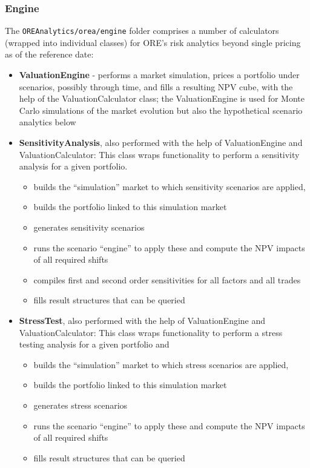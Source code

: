\documentclass[12pt, a4paper]{report}
\begin{document}
\subsubsection{Engine}
The {\tt OREAnalytics/orea/engine} folder comprises a number of calculators (wrapped into individual classes) for ORE's risk analytics beyond single pricing as of the reference date:
\begin{itemize}
\item {\bf ValuationEngine} - performs a market simulation, prices a portfolio under scenarios, possibly through time, and fills a resulting NPV cube, with the help of the ValuationCalculator class; the ValuationEngine is used for Monte Carlo simulations of the market evolution but also the hypothetical scenario analytics below
\item {\bf SensitivityAnalysis}, also performed with the help of ValuationEngine and ValuationCalculator: This class wraps functionality to perform a sensitivity analysis for a given portfolio.
\begin{itemize}
\item builds the ``simulation'' market to which sensitivity scenarios are applied, 
\item builds the portfolio linked to this simulation market
\item generates sensitivity scenarios
\item runs the scenario ``engine'' to apply these and compute the NPV impacts of all required shifts
\item compiles first and second order sensitivities for all factors and all trades
\item fills result structures that can be queried
\end{itemize}
\item {\bf StressTest}, also performed with the help of ValuationEngine and ValuationCalculator: This class wraps functionality to perform a stress testing analysis for a given portfolio and
\begin{itemize}
\item builds the ``simulation'' market to which stress scenarios are applied, 
\item builds the portfolio linked to this simulation market
\item generates stress scenarios
\item runs the scenario ``engine'' to apply these and compute the NPV impacts of all required shifts
\item fills result structures that can be queried

\end{itemize}
\end{itemize}
\end{document}
